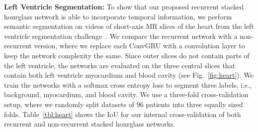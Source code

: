 \documentclass[runningheads,a4paper]{llncs}
\newcommand{\thomas}[1]{\textcolor{purple}{[#1]}}
\begin{document}
\noindent\textbf{Left Ventricle Segmentation:}
To show that our proposed recurrent stacked hourglass network is able to incorporate temporal information, we perform semantic segmentation on videos of short-axis MR slices of the heart from the left ventricle segmentation challenge~\cite{Suinesiaputra2014}.
We compare the recurrent network with a non-recurrent version, where we replace each \mbox{ConvGRU} with a convolution layer to keep the network complexity the same.
Since outer slices do not contain parts of the left ventricle, the networks are evaluated on the three central slices that contain both left ventricle myocardium and blood cavity (see Fig.~\ref{fig:heart}). %
We train the networks with a softmax cross entropy loss to segment three labels, i.e., background, myocardium, and blood cavity.
We use a three-fold cross-validation setup, where we randomly split datasets of 96 patients into three equally sized folds.
Table~\ref{tbl:heart} shows the IoU for our internal cross-validation of both recurrent and non-recurrent stacked hourglass networks.
\end{document}
